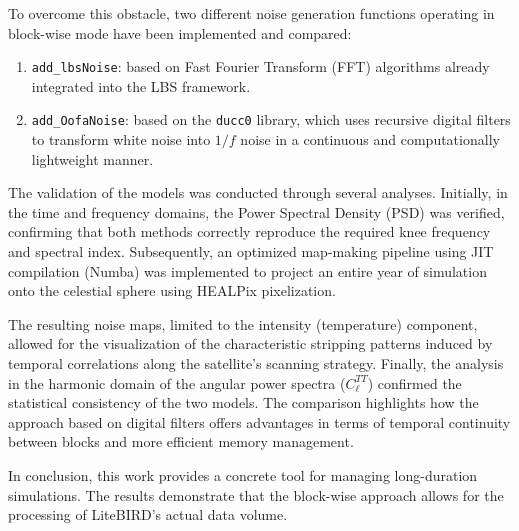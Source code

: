 \documentclass{report}
\begin{document}
To overcome this obstacle, two different noise generation functions operating in block-wise mode have been implemented and compared: 

\begin{enumerate}
    \item \texttt{add\_lbsNoise}: based on Fast Fourier Transform (FFT) algorithms already integrated into the LBS framework.
    \item \texttt{add\_OofaNoise}: based on the \texttt{ducc0} library, which uses recursive digital filters to transform white noise into $1/f$ noise in a continuous and computationally lightweight manner.
\end{enumerate}

The validation of the models was conducted through several analyses. Initially, in the time and frequency domains, the Power Spectral Density (PSD) was verified, confirming that both methods correctly reproduce the required knee frequency and spectral index. Subsequently, an optimized map-making pipeline using JIT compilation (Numba) was implemented to project an entire year of simulation onto the celestial sphere using HEALPix pixelization.

The resulting noise maps, limited to the intensity (temperature) component, allowed for the visualization of the characteristic stripping patterns induced by temporal correlations along the satellite's scanning strategy. Finally, the analysis in the harmonic domain of the angular power spectra ($C_\ell^{TT}$) confirmed the statistical consistency of the two models. The comparison highlights how the approach based on digital filters offers advantages in terms of temporal continuity between blocks and more efficient memory management.

In conclusion, this work provides a concrete tool for managing long-duration simulations. The results demonstrate that the block-wise approach allows for the processing of LiteBIRD's actual data volume.





\tableofcontents
\newpage













\cleardoublepage
\printbibliography

\cleardoublepage
\appendix
\renewcommand{\thechapter}{\Alph{chapter}} 



\end{document}
